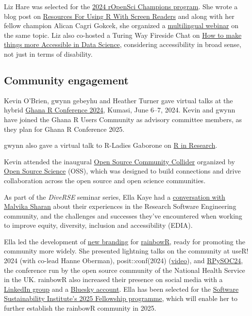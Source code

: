 Liz Hare was selected for the \href{https://ropensci.org/blog/2024/02/15/champions-program-champions-2024/}{2024 rOpenSci Champions program}.
She wrote a blog post on \href{https://ropensci.org/blog/2024/09/05/screen-readers-tools/}{Resources For Using R With Screen Readers}
and along with her fellow champion Alican Cagri Gokcek, she
organized a \href{https://vimeo.com/1008631708}{multilingual webinar} on the same topic.
Liz also co-hosted a Turing Way Fireside Chat on
\href{https://www.youtube.com/watch?v=Ac9czT3Tr8A}{How to make things more Accessible in Data Science},
considering accessibility in broad sense, not just in terms of disability.

\hypertarget{community-engagement}{%
\subsection{Community engagement}\label{community-engagement}}

Kevin O'Brien, gwynn gebeyhu and Heather Turner gave virtual talks at the
hybrid \href{https://ghana-rusers.org/r-conference-2024/}{Ghana R Conference 2024},
Kumasi, June 6--7, 2024. Kevin and gwynn have joined the Ghana R
Users Community as advisory committee members, as they plan for
Ghana R Conference 2025.

gwynn also gave a virtual talk to R-Ladies Gaborone on \href{https://www.youtube.com/watch?v=n9T1v2CEI4w}{R in Research}.

Kevin attended the inaugural \href{https://www.opensource.science/updates/inaugural-run-of-the-open-source-community-collider-a-smashing-success}{Open Source Community Collider}
organized by \href{https://www.opensource.science}{Open Source Science} (OSS), which was designed to
build connections and drive collaboration across the open source and open
science communities.

As part of the \emph{DiveRSE} seminar series, Ella Kaye had a \href{https://diverse-rse.github.io/events/2024-07-31}{conversation with Malvika Sharan}
about their experiences in the Research Software Engineering community, and the
challenges and successes they've encountered when working to improve equity,
diversity, inclusion and accessibility (EDIA).

Ella led the development of \href{https://rainbowr.org/posts/2024-06-07_new-look/}{new branding}
for \href{https://rainbowr.org}{rainbowR}, ready for promoting the community more
widely. She presented lightning talks on the community at useR! 2024 (with co-lead Hanne Oberman),
posit::conf(2024) (\href{https://www.youtube.com/watch?v=zOEZtIPj6Vk}{video}), and \href{https://nhsrcommunity.com/conference24.html}{RPySOC24},
the conference run by the open source community of the National Health Service
in the UK. rainbowR also increased their presence on social media with a
\href{https://www.linkedin.com/groups/13115940/}{LinkedIn group} and a \href{https://bsky.app/profile/rainbowr.bsky.social}{Bluesky account}. Ella has been selected for the
\href{https://www.software.ac.uk/news/introducing-2025-fellowship-cohort-insights-and-celebrations}{Software Sustainability Institute's 2025 Fellowship programme},
which will enable her to further establish the rainbowR community in 2025.

